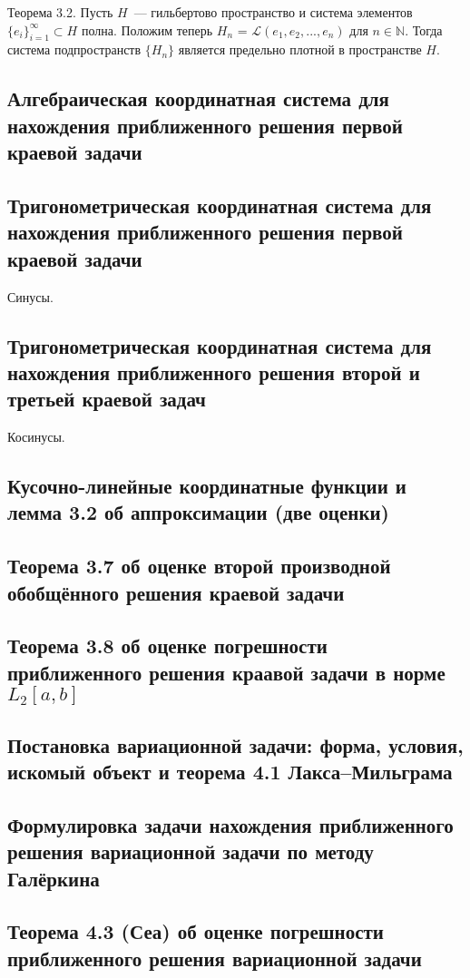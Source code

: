 \documentclass[a4paper,14pt]{article} %
\begin{document}
Теорема 3.2.
Пусть $H$~--- гильбертово пространство и
система элементов $\{e_i \}_{i=1}^\infty \subset H$ полна.
Положим теперь $H_n$ = $\mathcal{L} (e_1 , e_2 , ... , e_n )$ для $n \in \mathbb{N}$.
Тогда система подпространств $\{H_n \}$
является предельно плотной в пространстве $H$.


\subsection{Алгебраическая координатная система для нахождения приближенного решения первой краевой задачи}

\subsection{Тригонометрическая координатная система для нахождения приближенного решения первой краевой задачи}
Синусы.

\subsection{Тригонометрическая координатная система для нахождения приближенного решения второй и третьей краевой задач}
Косинусы.

\subsection{Кусочно-линейные координатные функции и лемма 3.2 об аппроксимации (две оценки)}

\subsection{Теорема 3.7 об оценке второй производной обобщённого решения краевой задачи}

\subsection{Теорема 3.8 об оценке погрешности приближенного решения краавой задачи в норме $L_2[a,b]$}

\subsection{Постановка вариационной задачи: форма, условия, искомый объект и теорема 4.1 Лакса--Мильграма}

\subsection{Формулировка задачи нахождения приближенного решения вариационной задачи по методу Галёркина}

\subsection{Теорема 4.3 (Сеа) об оценке погрешности приближенного решения вариационной задачи}
\end{document}
